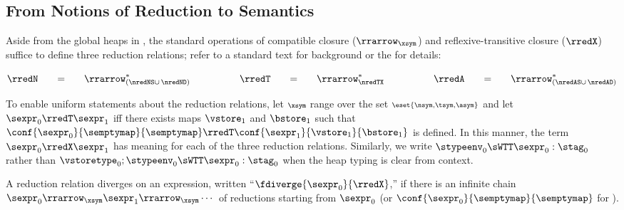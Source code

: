 \subsection{From Notions of Reduction to Semantics} \label{sec:reduction-lifting}

Aside from the global heaps in \Tname{}, the standard operations of
 compatible closure ($\rrarrow_{\mathsf{\xsym}}$)
 and reflexive-transitive closure ($\rredX$)
 suffice to define three reduction relations;
 refer to a standard text for background
 or the \techreport{} for details:

\smallskip\(
 \hfill
 \rredN ~~~~~=~~~~~ \rrarrow^{*}_{(\nredNS \cup\, \nredND)}
 \qquad\qquad\quad
 \rredT ~~~~~=~~~~~ \rrarrow^{*}_{\nredTX}
 \qquad\qquad\quad
 \rredA ~~~~~=~~~~~ \rrarrow^{*}_{(\nredAS \cup\, \nredAD)}
 \hfill
\)\smallskip


To enable uniform statements about the reduction relations,
 let $\scriptstyle\mathsf{\xsym}$ range over the set $\scriptstyle\eset{\mathsf{\nsym}, \mathsf{\tsym}, \mathsf{\asym}}$
 and let $\sexpr_0 \rredT \sexpr_1$ iff there exists maps $\vstore_1$ and $\bstore_1$
 such that $\conf{\sexpr_0}{\semptymap}{\semptymap} \rredT \conf{\sexpr_1}{\vstore_1}{\bstore_1}$
 is defined.
In this manner, the term $\sexpr_0 \rredX \sexpr_1$ has meaning for each of
 the three reduction relations.
Similarly, we write $\stypeenv_0 \sWTT \sexpr_0 : \stag_0$
 rather than $\vstoretype_0; \stypeenv_0 \sWTT \sexpr_0 : \stag_0$
 when the heap typing is clear from context.

A reduction relation diverges on an expression,
 written ``$\fdiverge{\sexpr_0}{\rredX}$,'' if there is an infinite chain
 $\sexpr_0 \rrarrow_{\mathsf{\xsym}} \sexpr_1 \rrarrow_{\mathsf{\xsym}} \cdots$ 
 of reductions starting from $\sexpr_0$ (or $\conf{\sexpr_0}{\semptymap}{\semptymap}$ for \Tname{}).

